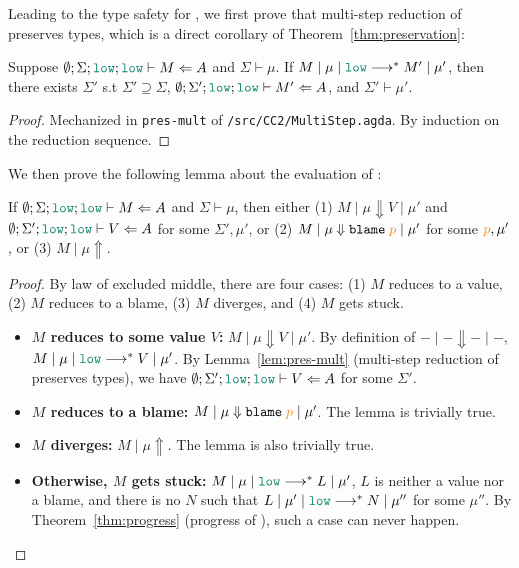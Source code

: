 Leading to the type safety for \Surface, we first prove that multi-step
reduction of \CC preserves types, which is a direct corollary of
Theorem~\ref{thm:preservation}:

\begin{lemma}
  \label{lem:pres-mult}
  Suppose $\emptyset ; \Sigma ; \low ; \low \vdash M \Leftarrow A$ and $\Sigma \vdash \mu$.
  If $\reducemult{M}{\mu}{\low}{M'}{\mu'}$,
  then there exists $\Sigma'$ s.t $\Sigma' \supseteq \Sigma$, $\emptyset ; \Sigma' ; \low ; \low \vdash M' \Leftarrow A$,
  and $\Sigma' \vdash \mu'$.
\end{lemma}
\begin{proof}
  Mechanized in \texttt{pres-mult} of \texttt{/src/CC2/MultiStep.agda}. By
  induction on the reduction sequence.
\end{proof}

We then prove the following lemma about the evaluation of \CC:

\begin{lemma}
  \label{lem:pres-bigstep}
  If $\emptyset ; \Sigma ; \low ; \low \vdash M \Leftarrow A$ and $\Sigma \vdash
  \mu$, then either (1) $M \mid \mu \Downarrow V \mid \mu'$ and $\emptyset ;
  \Sigma' ; \low ; \low \vdash V \Leftarrow A$ for some $\Sigma', \mu'$, or (2)
  $M \mid \mu \Downarrow \blame{p} \mid \mu'$ for some $\bl{p}, \mu'$, or (3) $M
  \mid \mu \Uparrow$.
\end{lemma}
\begin{proof}
  By law of excluded middle, there are four cases: (1) $M$ reduces to a value,
  (2) $M$ reduces to a blame, (3) $M$ diverges, and (4) $M$ gets stuck.
  \begin{itemize}
    \item \textbf{$M$ reduces to some value $V$:} $M \mid \mu \Downarrow V \mid
      \mu'$. By definition of ${-}\mid{-}\Downarrow{-}\mid{-}$,
      $\reducemult{M}{\mu}{\low}{V}{\mu'}$. By Lemma~\ref{lem:pres-mult}
      (multi-step reduction of \CC preserves types), we have $\emptyset ; \Sigma' ;
      \low ; \low \vdash V \Leftarrow A$ for some $\Sigma'$.
    \item \textbf{$M$ reduces to a blame:} $M \mid \mu \Downarrow \blame{p} \mid
      \mu'$. The lemma is trivially true.
    \item \textbf{$M$ diverges:} $M \mid \mu \Uparrow$. The lemma is also
      trivially true.
    \item \textbf{Otherwise, $M$ gets stuck:} $\reducemult{M}{\mu}{\low}{L}{\mu'}$, $L$ is
      neither a value nor a blame, and there is no $N$ such that
      $\reducemult{L}{\mu'}{\low}{N}{\mu''}$ for some $\mu''$. By
      Theorem~\ref{thm:progress} (progress of \CC), such a case can never happen.
  \end{itemize}
\end{proof}

